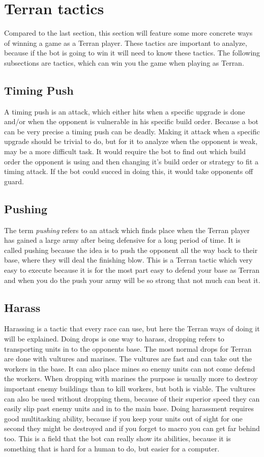 \section{Terran tactics}
	Compared to the last section, this section will feature some more concrete ways of winning a game as a Terran player. 
	These tactics are important to analyze, because if the bot is going to win it will need to know these tactics.
	The following subsections are tactics, which can win you the game when playing as Terran.
	
	\subsection{Timing Push}
		A timing push is an attack, which either hits when a specific upgrade is done and/or when the opponent is vulnerable in his specific build order. 
		Because a bot can be very precise a timing push can be deadly. Making it attack when a specific upgrade should be trivial to do, but for it to 
		analyze when the opponent is weak, may be a more difficult task. It would require the bot to find out which build order the opponent is using and 
		then changing it's build order or strategy to fit a timing attack. If the bot could succed in doing this, it would take opponents off guard.
		
	\subsection{Pushing}
		The term {\it pushing} refers to an attack which finds place when the Terran player has gained a large army after being defensive for a long 
		period of time. It is called pushing because the idea is to push the opponent 
		all the way back to their base, where they will deal the finishing blow. This is a Terran tactic which very easy to execute because it is for the 
		most part easy to defend your base as Terran and when you do the push your army will be so strong that not much can beat it.
		
	\subsection{Harass}
		Harassing is a tactic that every race can use, but here the Terran ways of doing it will be explained. Doing drops is one way to harass, dropping 
		refers to transporting units in to the opponents base. The most normal drops for Terran are done with vultures and marines. The vultures are 
		fast and can take out the workers in the base. It can also place mines so enemy units can not come defend the workers. When dropping with marines 
		the purpose is usually more to destroy important enemy buildings than to kill workers, but both is viable. The vultures can also be used without 
		dropping them, because of their superior speed they can easily slip past enemy units and in to the main base. Doing harassment requires 
		good multitasking ability, because if you keep your units out of sight for one second they might be destroyed and if you forget to macro you can 
		get far behind too. This is a field that the bot can really show its abilities, because it is something that is hard for a human to do, but 
		easier for a computer.
	
